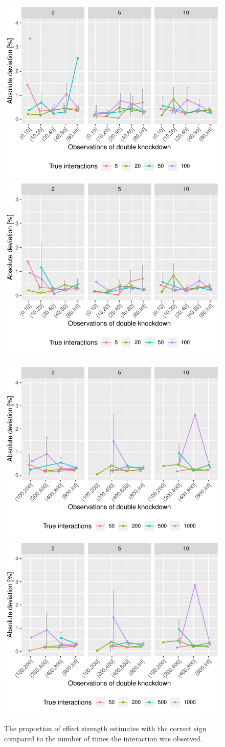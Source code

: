 \begin{figure}
	\begin{minipage}{\linewidth}
	\centering
	\includegraphics[width=0.5\linewidth]{"output/FXdiff_n1000_tno"}%
	\includegraphics[width=0.5\linewidth]{"output/FXdiff_n1000_tyes"}
\end{minipage}
\begin{minipage}{\linewidth}
	\centering
	\includegraphics[width=0.5\linewidth]{"output/FXdiff_n10000_tno"}%
	\includegraphics[width=0.5\linewidth]{"output/FXdiff_n10000_tyes"}
\end{minipage}
\caption{The proportion of effect strength estimates with the correct sign compared to the number of times the interaction was observed.}
\end{figure}






